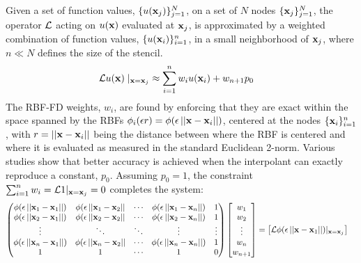 \documentclass{report}
\begin{document}
{Given a set of function values, $\{u(\mathbf{x}_j)\}_{j=1}^{N}$, on a set of $N$ nodes $\{\mathbf{x}_j\}_{j=1}^{N}$, the operator $\diffop$ acting on $u(\mathbf{x})$ evaluated at 
$\mathbf{x}_j$, %
is approximated by a weighted combination of function values, $\{u(\mathbf{x}_i)\}_{i=1}^{n}$, in a small neighborhood of $\mathbf{x}_j$, 
where $n\ll N$ defines the size of the stencil. 
\begin{align}
\mathcal{L}u(\mathbf{x})\mid_{\mathbf{x}=\mathbf{x}_j} &\approx \sum_{i=1}^{n} w_i u(\mathbf{x}_i) + w_{n+1} p_0
\label{eq:derivFromFDWeights}
\end{align}
The RBF-FD weights, ${w_i}$, are found by enforcing that they are exact within the space spanned by the RBFs $\phi_i(\epsilon r) = \phi(\epsilon\left|\left|\mathbf{x}-\mathbf{x}_{i}\right|\right|)$, centered at the nodes $\{\mathbf{x}_i\}_{i=1}^{n}$, with 
$r=\left|\left|\mathbf{x} - \mathbf{x}_i\right|\right|$
being the distance between where the RBF is centered and where it is evaluated as measured in the standard Euclidean 2-norm. Various studies show  \cite{WrightFornberg06,FornbergDriscoll02,FornbergLehto11,FlyerLehto11} that better accuracy is achieved when the 
interpolant can exactly reproduce a constant, $p_0$.  
Assuming $p_0 = 1$, the constraint $\sum_{i=1}^{n}w_i=\mathcal{L}1|_{\mathbf{x}=\mathbf{x}_{j}}=0$ completes the system: 
\begin{align}
\begin{pmatrix}
\phi(\epsilon\left|\left|\mathbf{x}_1-\mathbf{x}_1\right|\right|) & \phi(\epsilon\left|\left|\mathbf{x}_1-\mathbf{x}_2\right|\right| & \cdots & \phi(\epsilon\left|\left|\mathbf{x}_1-\mathbf{x}_n\right|\right|) & 1 \\
\phi(\epsilon\left|\left|\mathbf{x}_2-\mathbf{x}_1\right|\right|) & \phi(\epsilon\left|\left|\mathbf{x}_2-\mathbf{x}_2\right|\right| & \cdots &
\phi(\epsilon\left|\left|\mathbf{x}_2-\mathbf{x}_n\right|\right|) & 1\\
\vdots & \ddots & \ddots & \vdots & \vdots\\
\phi(\epsilon\left|\left|\mathbf{x}_n-\mathbf{x}_1\right|\right|) & \phi(\epsilon\left|\left|\mathbf{x}_n-\mathbf{x}_2\right|\right| & \cdots &
\phi(\epsilon\left|\left|\mathbf{x}_n-\mathbf{x}_n\right|\right|) & 1 \\
1 & 1 & \cdots & 1 & 0
\end{pmatrix}
\begin{bmatrix} w_1 \\ w_2 \\ \vdots \\ w_n  \\ w_{n+1}\end{bmatrix}
&=
\begin{bmatrix} \mathcal{L}\phi(\epsilon\left|\left|\mathbf{x}-\mathbf{x}_{1}\right|\right|)|_{\mathbf{x}=\mathbf{x}_{j}} \\

\end{bmatrix}
\end{align}}
\end{document}
